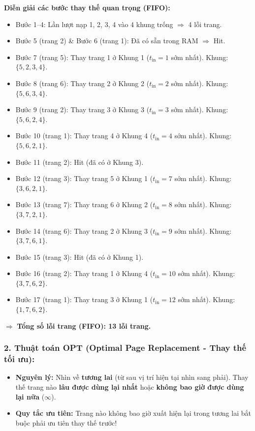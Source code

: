 \documentclass[11pt,a4paper]{article}
\begin{document}
\textbf{Diễn giải các bước thay thế quan trọng (FIFO):}
\begin{itemize}[noitemsep]
    \item Bước 1--4: Lần lượt nạp 1, 2, 3, 4 vào 4 khung trống $\Rightarrow$ 4 lỗi trang.
    \item Bước 5 (trang 2) \& Bước 6 (trang 1): Đã có sẵn trong RAM $\Rightarrow$ Hit.
    \item Bước 7 (trang 5): Thay trang 1 ở Khung 1 ($t_{\text{in}}=1$ sớm nhất). Khung: $\{5, 2, 3, 4\}$.
    \item Bước 8 (trang 6): Thay trang 2 ở Khung 2 ($t_{\text{in}}=2$ sớm nhất). Khung: $\{5, 6, 3, 4\}$.
    \item Bước 9 (trang 2): Thay trang 3 ở Khung 3 ($t_{\text{in}}=3$ sớm nhất). Khung: $\{5, 6, 2, 4\}$.
    \item Bước 10 (trang 1): Thay trang 4 ở Khung 4 ($t_{\text{in}}=4$ sớm nhất). Khung: $\{5, 6, 2, 1\}$.
    \item Bước 11 (trang 2): Hit (đã có ở Khung 3).
    \item Bước 12 (trang 3): Thay trang 5 ở Khung 1 ($t_{\text{in}}=7$ sớm nhất). Khung: $\{3, 6, 2, 1\}$.
    \item Bước 13 (trang 7): Thay trang 6 ở Khung 2 ($t_{\text{in}}=8$ sớm nhất). Khung: $\{3, 7, 2, 1\}$.
    \item Bước 14 (trang 6): Thay trang 2 ở Khung 3 ($t_{\text{in}}=9$ sớm nhất). Khung: $\{3, 7, 6, 1\}$.
    \item Bước 15 (trang 3): Hit (đã có ở Khung 1).
    \item Bước 16 (trang 2): Thay trang 1 ở Khung 4 ($t_{\text{in}}=10$ sớm nhất). Khung: $\{3, 7, 6, 2\}$.
    \item Bước 17 (trang 1): Thay trang 3 ở Khung 1 ($t_{\text{in}}=12$ sớm nhất). Khung: $\{1, 7, 6, 2\}$.
\end{itemize}
$\Rightarrow$ \textbf{Tổng số lỗi trang (FIFO): 13 lỗi trang.}

\subsubsection*{2. Thuật toán OPT (Optimal Page Replacement - Thay thế tối ưu):}
\begin{itemize}[noitemsep]
    \item \textbf{Nguyên lý:} Nhìn về \textbf{tương lai} (từ sau vị trí hiện tại nhìn sang phải). Thay thế trang nào \textbf{lâu được dùng lại nhất} hoặc \textbf{không bao giờ được dùng lại nữa} ($\infty$).
    \item \textbf{Quy tắc ưu tiên:} Trang nào không bao giờ xuất hiện lại trong tương lai bắt buộc phải ưu tiên thay thế trước!
\end{itemize}
\end{document}
